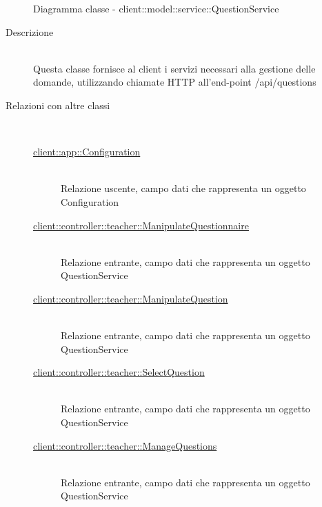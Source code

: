 \vspace{0.5cm}
\hypertarget{client::model::service::QuestionService}{}
\begin{figure}[H]
	\centering
	\caption{Diagramma classe - client::model::service::QuestionService}
\end{figure}\begin{description}
\item[Descrizione] \hfill \\
Questa classe fornisce al client i servizi necessari alla gestione delle domande, utilizzando chiamate HTTP all'end-point /api/questions
\item[Relazioni con altre classi] \hfill \\
\vspace{-7mm}
\begin{description}
	\item[\hyperlink{client::app::Configuration}{client::app::Configuration}] \hfill \\
	Relazione uscente, campo dati che rappresenta un oggetto Configuration
	\item[\hyperlink{client::controller::teacher::ManipulateQuestionnaire}{client::controller::teacher::ManipulateQuestionnaire}] \hfill \\
	Relazione entrante, campo dati che rappresenta un oggetto QuestionService
	\item[\hyperlink{client::controller::teacher::ManipulateQuestion}{client::controller::teacher::ManipulateQuestion}] \hfill \\
	Relazione entrante, campo dati che rappresenta un oggetto QuestionService
	\item[\hyperlink{client::controller::teacher::SelectQuestion}{client::controller::teacher::SelectQuestion}] \hfill \\
	Relazione entrante, campo dati che rappresenta un oggetto QuestionService
	\item[\hyperlink{client::controller::teacher::ManageQuestions}{client::controller::teacher::ManageQuestions}] \hfill \\
	Relazione entrante, campo dati che rappresenta un oggetto QuestionService
\end{description}


\end{description}
